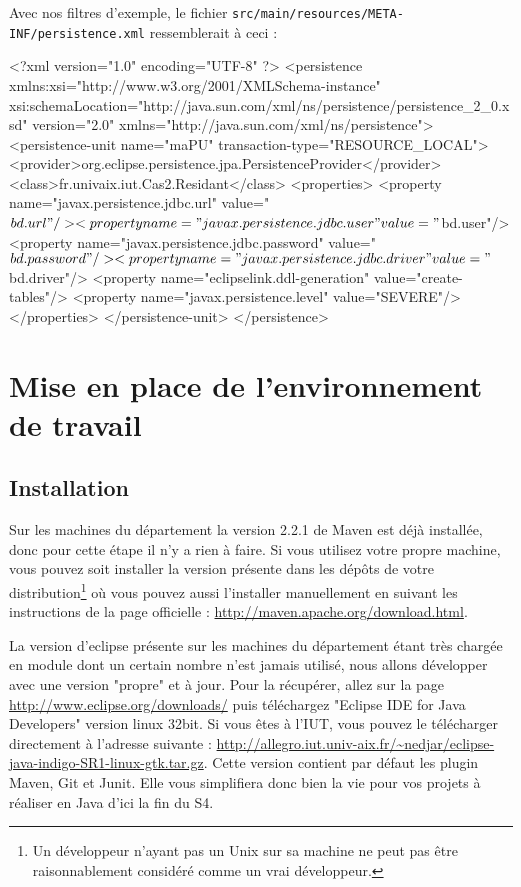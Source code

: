 \documentclass[a4paper,11pt]{article}
\begin{document}
Avec nos filtres d'exemple, le fichier \texttt{src/main/resources/META-INF/persistence.xml} ressemblerait à ceci :
\begin{code_xml}
<?xml version="1.0" encoding="UTF-8" ?>
<persistence xmlns:xsi="http://www.w3.org/2001/XMLSchema-instance" 
             xsi:schemaLocation="http://java.sun.com/xml/ns/persistence/persistence_2_0.xsd" version="2.0" 
             xmlns="http://java.sun.com/xml/ns/persistence">
  <persistence-unit name="maPU" transaction-type="RESOURCE_LOCAL">
    <provider>org.eclipse.persistence.jpa.PersistenceProvider</provider>
    <class>fr.univaix.iut.Cas2.Residant</class>
    <properties>
      <property name="javax.persistence.jdbc.url" value="${bd.url}"/>
      <property name="javax.persistence.jdbc.user" value="${bd.user}"/>
      <property name="javax.persistence.jdbc.password" value="${bd.password}"/>
      <property name="javax.persistence.jdbc.driver" value="${bd.driver}"/>
      <property name="eclipselink.ddl-generation" value="create-tables"/>
      <property name="javax.persistence.level" value="SEVERE"/>
    </properties>
  </persistence-unit>
</persistence>
\end{code_xml}

\section{Mise en place de l'environnement de travail}
\subsection{Installation}
Sur les machines du département la version 2.2.1 de Maven est déjà installée, donc pour cette étape il n'y a rien à faire.
Si vous utilisez votre propre machine, vous pouvez soit installer la version présente dans les dépôts de votre 
distribution\footnote{Un développeur n'ayant pas un Unix sur sa machine ne peut pas être raisonnablement considéré comme un vrai développeur.}
où vous pouvez aussi l'installer manuellement en suivant les instructions de la page officielle : \url{http://maven.apache.org/download.html}.

La version d'eclipse présente sur les machines du département étant très chargée en module dont un certain nombre n'est jamais utilisé, 
nous allons développer avec une version "propre" et à jour. Pour la récupérer, allez sur la page 
\url{http://www.eclipse.org/downloads/} puis téléchargez "Eclipse IDE for Java Developers" version linux 32bit. Si vous 
êtes à l'IUT, vous pouvez le télécharger directement à l'adresse suivante : 
\url{http://allegro.iut.univ-aix.fr/~nedjar/eclipse-java-indigo-SR1-linux-gtk.tar.gz}. Cette version contient par défaut 
les plugin Maven, Git et Junit. Elle vous simplifiera donc bien la vie pour vos projets à réaliser en Java d'ici la fin du S4.
\end{document}
